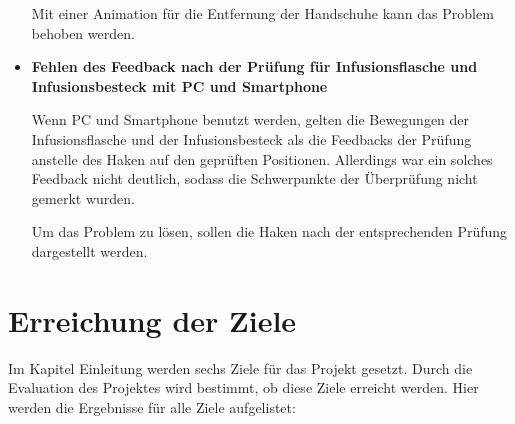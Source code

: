 \begin{itemize}
    Mit einer Animation für die Entfernung der Handschuhe kann das Problem behoben werden.
    
    \item \textbf{Fehlen des Feedback nach der Prüfung für Infusionsflasche und Infusionsbesteck mit PC und Smartphone}
    
    Wenn PC und Smartphone benutzt werden, gelten die Bewegungen der Infusionsflasche und der Infusionsbesteck als die Feedbacks der Prüfung anstelle des Haken auf den geprüften Positionen. Allerdings war ein solches Feedback nicht deutlich, sodass die Schwerpunkte der Überprüfung nicht gemerkt wurden.
    
    Um das Problem zu lösen, sollen die Haken nach der entsprechenden Prüfung dargestellt werden.
\end{itemize}



\section{Erreichung der Ziele}

Im Kapitel Einleitung werden sechs Ziele für das Projekt gesetzt. Durch die Evaluation des Projektes wird bestimmt, ob diese Ziele erreicht werden. Hier werden die Ergebnisse für alle Ziele aufgelistet:


